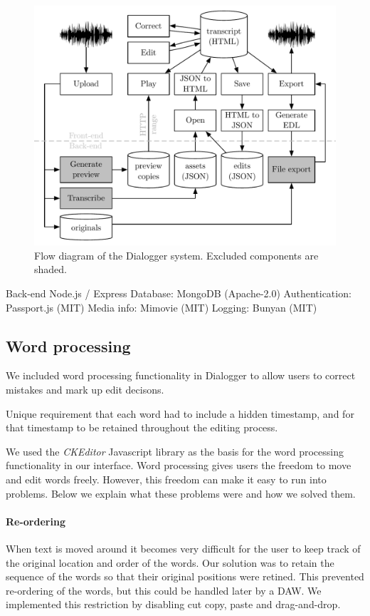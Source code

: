 \begin{figure}[t]
\centering
  \includegraphics[width=.8\textwidth]{figs/dialogger-flow-diagram.pdf}
  \caption{Flow diagram of the Dialogger system. Excluded components are shaded.}
  \label{fig:dialogger-flow}
\end{figure}


Back-end
Node.js / Express
Database: MongoDB (Apache-2.0)
Authentication: Passport.js (MIT)
Media info: Mimovie (MIT)
Logging: Bunyan (MIT)

\subsection{Word processing}

We included word processing functionality in Dialogger to allow users to correct mistakes and mark up edit decisons.

Unique requirement that each word had to include a hidden timestamp, and for that timestamp to be retained throughout
the editing process.

We used the \textit{CKEditor} Javascript library as the basis for the word processing functionality in our interface.
Word processing gives users the freedom to move and edit words freely. However, this freedom can make it easy to
run into problems. Below we explain what these problems were and how we solved them.

\paragraph{Re-ordering}

When text is moved around it becomes very difficult for the user to keep track of the original location and order of
the words. Our solution was to retain the sequence of the words so that their original positions were retined. This
prevented re-ordering of the words, but this could be handled later by a DAW.  We implemented this restriction by
disabling cut copy, paste and drag-and-drop.

